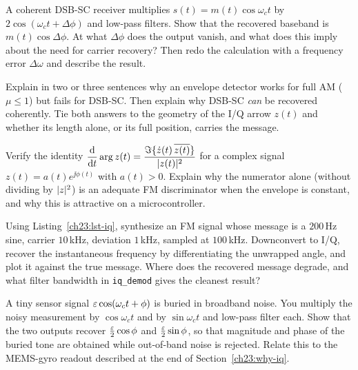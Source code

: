 \begin{exercise}
\label{ch23:ex-phaseerr}
A coherent DSB-SC receiver multiplies $s(t)=m(t)\cos\omega_c t$ by $2\cos(\omega_c
t+\Delta\phi)$ and low-pass filters. Show that the recovered baseband is
$m(t)\cos\Delta\phi$. At what $\Delta\phi$ does the output vanish, and what does this
imply about the need for carrier recovery? Then redo the calculation with a frequency
error $\Delta\omega$ and describe the result.
\end{exercise}

\begin{exercise}
\label{ch23:ex-envcoh}
Explain in two or three sentences why an envelope detector works for full AM ($\mu\le 1$)
but fails for DSB-SC. Then explain why DSB-SC \emph{can} be recovered coherently. Tie both
answers to the geometry of the I/Q arrow $z(t)$ and whether its length alone, or its full
position, carries the message.
\end{exercise}

\begin{exercise}
\label{ch23:ex-fmdisc}
Verify the identity $\dfrac{\mathrm{d}}{\mathrm{d} t}\arg z(t) = \dfrac{\Im\{\dot z(t)\,\overline{z(t)}\}}
{\lvert z(t)\rvert^2}$ for a complex signal $z(t)=a(t)e^{\jj\phi(t)}$ with $a(t)>0$. Explain why
the numerator alone (without dividing by $\lvert z\rvert^2$) is an adequate FM discriminator when
the envelope is constant, and why this is attractive on a microcontroller.
\end{exercise}

\begin{exercise}
\label{ch23:ex-numeric}
Using Listing~\ref{ch23:lst-iq}, synthesize an FM signal whose message is a $200\,$Hz
sine, carrier $10\,$kHz, deviation $1\,$kHz, sampled at $100\,$kHz. Downconvert to I/Q,
recover the instantaneous frequency by differentiating the unwrapped angle, and plot it
against the true message. Where does the recovered message degrade, and what filter
bandwidth in \texttt{iq\_demod} gives the cleanest result?
\end{exercise}

\begin{exercise}
\label{ch23:ex-lockin}
A tiny sensor signal $\varepsilon\cos(\omega_c t+\phi)$ is buried in broadband noise. You
multiply the noisy measurement by $\cos\omega_c t$ and by $\sin\omega_c t$ and low-pass
filter each. Show that the two outputs recover $\tfrac{\varepsilon}{2}\cos\phi$ and
$\tfrac{\varepsilon}{2}\sin\phi$, so that magnitude and phase of the buried tone are obtained
while out-of-band noise is rejected. Relate this to the MEMS-gyro readout described at the
end of Section~\ref{ch23:why-iq}.
\end{exercise}


